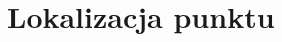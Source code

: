 \documentclass[oneside,brudnopis]{xelatex-mgr/xmgr}
\begin{document}
\section{Lokalizacja punktu}




% 
% 



\end{document}
